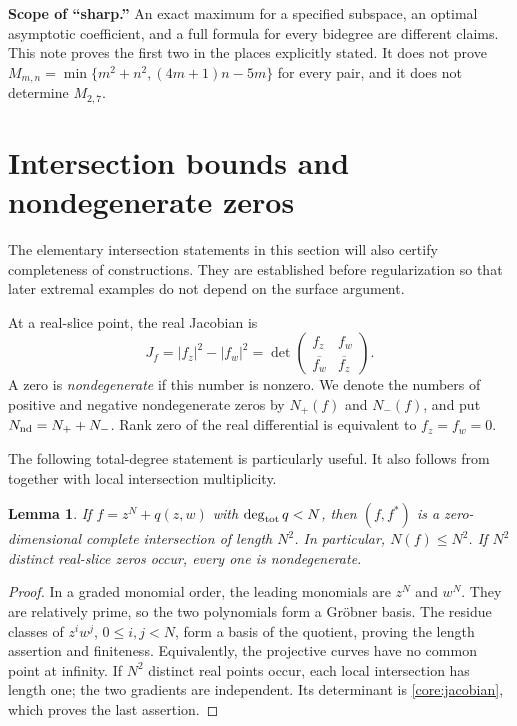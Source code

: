 \documentclass[UTF8,11pt]{ctexart}
\newtheorem{lem}[thm]{Lemma}
\theoremstyle{definition}
\numberwithin{equation}{section}
\begin{document}
\begin{tcolorbox}[colback=MidnightBlue!4,colframe=MidnightBlue!50,sharp corners,boxrule=.5pt]
\textbf{Scope of ``sharp.''} An exact maximum for a specified subspace, an optimal asymptotic coefficient, and a full formula for every bidegree are different claims. This note proves the first two in the places explicitly stated. It does not prove $M_{m,n}=\min\{m^2+n^2,(4m+1)n-5m\}$ for every pair, and it does not determine $M_{2,7}$.
\end{tcolorbox}

\section{Intersection bounds and nondegenerate zeros}\label{core:algebra}
The elementary intersection statements in this section will also certify completeness of constructions. They are established before regularization so that later extremal examples do not depend on the surface argument.

At a real-slice point, the real Jacobian is
\begin{equation}\label{core:jacobian}
 J_f=|f_z|^2-|f_w|^2
 =\det\begin{pmatrix}f_z&f_w\\\overline{f_w}&\overline{f_z}\end{pmatrix}.
\end{equation}
A zero is \emph{nondegenerate} if this number is nonzero. We denote the numbers of positive and negative nondegenerate zeros by $N_+(f)$ and $N_-(f)$, and put $N_{\rm nd}=N_++N_-$. Rank zero of the real differential is equivalent to $f_z=f_w=0$.

The following total-degree statement is particularly useful. It also follows from \cite[Corollary~2.14, p.~7]{SZ24} together with local intersection multiplicity.
\begin{lem}\label{d:lem:pure}
If $f=z^N+q(z,w)$ with $\deg_{\rm tot}q<N$, then $(f,f^*)$ is a zero-dimensional complete intersection of length $N^2$. In particular, $N(f)\le N^2$. If $N^2$ distinct real-slice zeros occur, every one is nondegenerate.
\end{lem}
\begin{proof}
In a graded monomial order, the leading monomials are $z^N$ and $w^N$. They are relatively prime, so the two polynomials form a Gr\"obner basis. The residue classes of $z^iw^j$, $0\le i,j<N$, form a basis of the quotient, proving the length assertion and finiteness. Equivalently, the projective curves have no common point at infinity. If $N^2$ distinct real points occur, each local intersection has length one; the two gradients are independent. Its determinant is \eqref{core:jacobian}, which proves the last assertion.
\end{proof}
\end{document}
